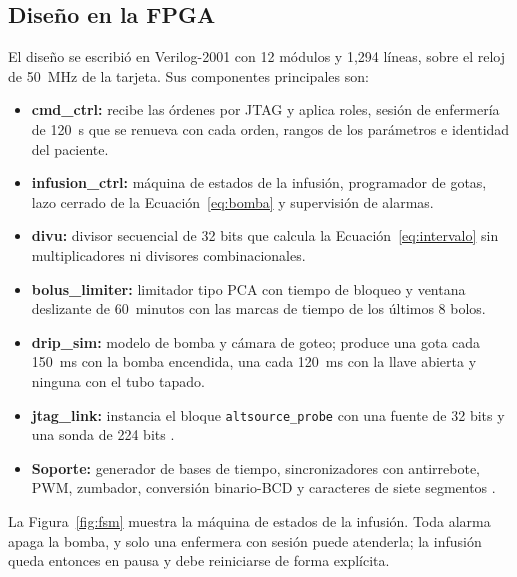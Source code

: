 \documentclass[11pt,letterpaper]{article}
\newcommand{\code}[1]{\texttt{#1}}
\begin{document}
\subsection{Diseño en la FPGA}
El diseño se escribió en Verilog-2001 \cite{verilog} con 12 módulos y 1,294 líneas, sobre el reloj de 50~MHz de la tarjeta. Sus componentes principales son:
\begin{itemize}
\item \textbf{cmd\_ctrl:} recibe las órdenes por JTAG y aplica roles, sesión de enfermería de 120~s que se renueva con cada orden, rangos de los parámetros e identidad del paciente.
\item \textbf{infusion\_ctrl:} máquina de estados de la infusión, programador de gotas, lazo cerrado de la Ecuación~\eqref{eq:bomba} y supervisión de alarmas.
\item \textbf{divu:} divisor secuencial de 32 bits que calcula la Ecuación~\eqref{eq:intervalo} sin multiplicadores ni divisores combinacionales.
\item \textbf{bolus\_limiter:} limitador tipo PCA con tiempo de bloqueo y ventana deslizante de 60~minutos con las marcas de tiempo de los últimos 8 bolos.
\item \textbf{drip\_sim:} modelo de bomba y cámara de goteo; produce una gota cada 150~ms con la bomba encendida, una cada 120~ms con la llave abierta y ninguna con el tubo tapado.
\item \textbf{jtag\_link:} instancia el bloque \code{altsource\_probe} con una fuente de 32 bits y una sonda de 224 bits \cite{issp}.
\item \textbf{Soporte:} generador de bases de tiempo, sincronizadores con antirrebote, PWM, zumbador, conversión binario-BCD y caracteres de siete segmentos \cite{chu}.
\end{itemize}

La Figura~\ref{fig:fsm} muestra la máquina de estados de la infusión. Toda alarma apaga la bomba, y solo una enfermera con sesión puede atenderla; la infusión queda entonces en pausa y debe reiniciarse de forma explícita.
\end{document}

